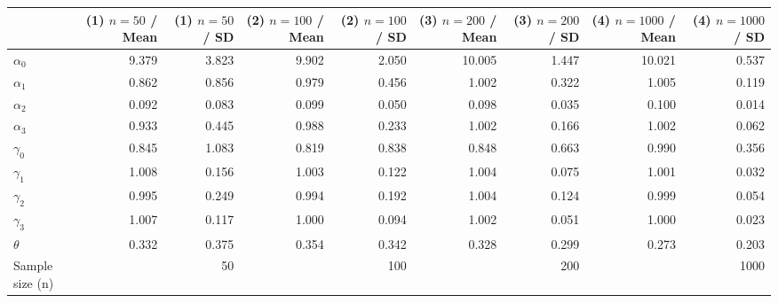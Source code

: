 
\begin{tabular}[t]{lrrrrrrrr}
\toprule
  & (1) $n=50$ / Mean & (1) $n=50$ / SD & (2) $n=100$ / Mean & (2) $n=100$ / SD & (3) $n=200$ / Mean & (3) $n=200$ / SD & (4) $n=1000$ / Mean & (4) $n=1000$ / SD\\
\midrule
$\alpha_{0}$ & 9.379 & 3.823 & 9.902 & 2.050 & 10.005 & 1.447 & 10.021 & 0.537\\
$\alpha_{1}$ & 0.862 & 0.856 & 0.979 & 0.456 & 1.002 & 0.322 & 1.005 & 0.119\\
$\alpha_{2}$ & 0.092 & 0.083 & 0.099 & 0.050 & 0.098 & 0.035 & 0.100 & 0.014\\
$\alpha_{3}$ & 0.933 & 0.445 & 0.988 & 0.233 & 1.002 & 0.166 & 1.002 & 0.062\\
$\gamma_{0}$ & 0.845 & 1.083 & 0.819 & 0.838 & 0.848 & 0.663 & 0.990 & 0.356\\
$\gamma_{1}$ & 1.008 & 0.156 & 1.003 & 0.122 & 1.004 & 0.075 & 1.001 & 0.032\\
$\gamma_{2}$ & 0.995 & 0.249 & 0.994 & 0.192 & 1.004 & 0.124 & 0.999 & 0.054\\
$\gamma_{3}$ & 1.007 & 0.117 & 1.000 & 0.094 & 1.002 & 0.051 & 1.000 & 0.023\\
$\theta$ & 0.332 & 0.375 & 0.354 & 0.342 & 0.328 & 0.299 & 0.273 & 0.203\\
Sample size (n) &  & 50 &  & 100 &  & 200 &  & 1000\\
\bottomrule
\end{tabular}
